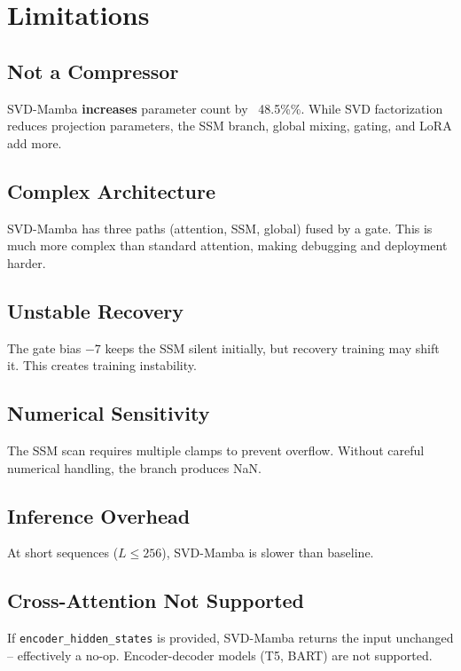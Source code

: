 
\section{Limitations}

\subsection{Not a Compressor}

SVD-Mamba \textbf{increases} parameter count by ~48.5\%\%. While SVD 
factorization reduces projection parameters, the SSM branch, global 
mixing, gating, and LoRA add more.

\subsection{Complex Architecture}

SVD-Mamba has three paths (attention, SSM, global) fused by a gate. This 
is much more complex than standard attention, making debugging and 
deployment harder.

\subsection{Unstable Recovery}

The gate bias $-7$ keeps the SSM silent initially, but recovery training 
may shift it. This creates training instability.

\subsection{Numerical Sensitivity}

The SSM scan requires multiple clamps to prevent overflow. Without careful 
numerical handling, the branch produces NaN.

\subsection{Inference Overhead}

At short sequences ($L \leq 256$), SVD-Mamba is slower than baseline.

\subsection{Cross-Attention Not Supported}

If \texttt{encoder\_hidden\_states} is provided, SVD-Mamba returns the input 
unchanged -- effectively a no-op. Encoder-decoder models (T5, BART) are 
not supported.

